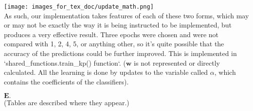 \documentclass[a4paper,12pt]{article}
\begin{document}
\texttt{[image: images\_for\_tex\_doc/update\_math.png]}\\
As such, our implementation takes features of each of these two forms, which may or may not be exactly the way it is being instructed to be implemented, but produces a very effective result. Three epochs were chosen and were not compared with 1, 2, 4, 5, or anything other, so it's quite possible that the accuracy of the predictions could be further improved. This is implemented in `shared\_functions.train\_kp() function`. 
($\textbf{w}$ is not represented or directly calculated. All the learning is done by updates to the variable called $\alpha$, which contains the coefficients of the classifiers).

$\textbf{E.}$\\
(Tables are described where they appear.)

\clearpage
\end{document}
